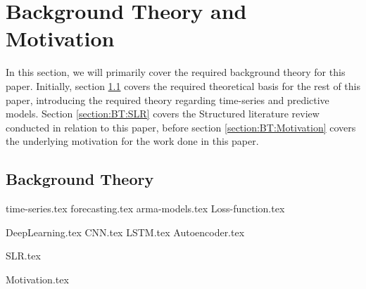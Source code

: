 \chapter{Background Theory and Motivation}\label{T-B}
\label{cha:TheoryAndBackground}


In this section, we will primarily cover the required background theory for this paper.
Initially, section \ref{section:BT:BackgroundTheory} covers the required theoretical basis for the rest of this paper,
introducing the required theory regarding time-series and predictive models.
Section \ref{section:BT:SLR} covers the Structured literature review conducted in relation to this paper,
before section \ref{section:BT:Motivation} covers the underlying motivation for the work done in this paper.
 


\section{Background Theory}
\label{section:BT:BackgroundTheory}
{time-series.tex}
{forecasting.tex}
{arma-models.tex}
{Loss-function.tex}

{DeepLearning.tex}
{CNN.tex}
{LSTM.tex}
{Autoencoder.tex}



{SLR.tex}


{Motivation.tex}
